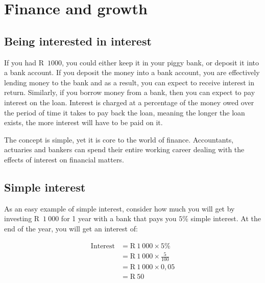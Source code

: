 \chapter{Finance and growth}

\section{Being interested in interest}


If you had R~$1 000$, you could either keep it in your piggy bank, or deposit it into a bank account. If you deposit the
money into a bank account, you are effectively lending money to the bank and as a result, you can expect to receive
interest in return. Similarly, if you borrow money from a bank, then you can expect to pay interest on the loan.
Interest is charged at a percentage of the money owed over the period of time it takes to pay back the loan, meaning
the longer the loan exists, the more interest will have to be paid on it.\par

The concept is simple, yet it is core to the world of finance. Accountants, actuaries and bankers can spend their
entire working career dealing with the effects of interest on financial matters.\par

\section{Simple interest}
  
As an easy example of simple interest, consider how much you will get by investing R~$1~000$ for 1 year with a bank that pays you $5\%$ simple interest. At the end of the year, you will get an interest of:\par
\begin{align*}
    \mbox{Interest} &= \text{R}~1~000 \times 5\%\\
    &= \text{R}~1~000 \times \frac{5}{100}\\
    &= \text{R}~1~000 \times 0,05\\
    &= \text{R}~50
\end{align*}

